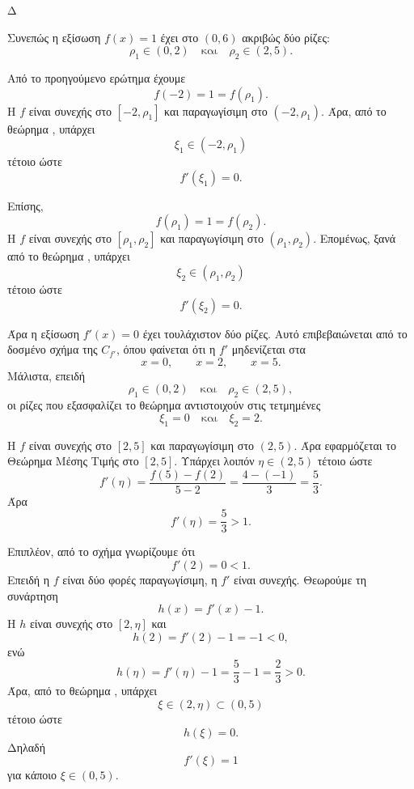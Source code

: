 \begin{thema}{Δ}
\begin{erwthma}
Συνεπώς η εξίσωση $f(x)=1$ έχει στο $(0,6)$ ακριβώς δύο ρίζες:
\[
{\rho_1\in(0,2)\quad\text{και}\quad \rho_2\in(2,5)}.
\]

\item Από το προηγούμενο ερώτημα έχουμε
\[
f(-2)=1=f(\rho_1).
\]
Η $f$ είναι συνεχής στο $[-2,\rho_1]$ και παραγωγίσιμη στο
$(-2,\rho_1)$. Άρα, από το θεώρημα , υπάρχει
\[
\xi_1\in(-2,\rho_1)
\]
τέτοιο ώστε
\[
{f'(\xi_1)=0}.
\]

Επίσης,
\[
f(\rho_1)=1=f(\rho_2).
\]
Η $f$ είναι συνεχής στο $[\rho_1,\rho_2]$ και παραγωγίσιμη στο
$(\rho_1,\rho_2)$. Επομένως, ξανά από το θεώρημα , υπάρχει
\[
\xi_2\in(\rho_1,\rho_2)
\]
τέτοιο ώστε
\[
{f'(\xi_2)=0}.
\]

Άρα η εξίσωση $f'(x)=0$ έχει τουλάχιστον δύο ρίζες. Αυτό επιβεβαιώνεται
από το δοσμένο σχήμα της $C_{f'}$, όπου φαίνεται ότι η $f'$ μηδενίζεται
στα
\[
x=0,\qquad x=2,\qquad x=5.
\]
Μάλιστα, επειδή
\[
\rho_1\in(0,2)\quad\text{και}\quad \rho_2\in(2,5),
\]
οι ρίζες που εξασφαλίζει το θεώρημα  αντιστοιχούν στις
τετμημένες
\[
{\xi_1=0\quad\text{και}\quad \xi_2=2}.
\]

\item Η $f$ είναι συνεχής στο $[2,5]$ και παραγωγίσιμη στο $(2,5)$.
Άρα εφαρμόζεται το Θεώρημα Μέσης Τιμής στο $[2,5]$. Υπάρχει λοιπόν
$\eta\in(2,5)$ τέτοιο ώστε
\[
f'(\eta)=\frac{f(5)-f(2)}{5-2}
=\frac{4-(-1)}{3}
=\frac{5}{3}.
\]
Άρα
\[
f'(\eta)=\frac53>1.
\]

Επιπλέον, από το σχήμα γνωρίζουμε ότι
\[
f'(2)=0<1.
\]
Επειδή η $f$ είναι δύο φορές παραγωγίσιμη, η $f'$ είναι συνεχής.
Θεωρούμε τη συνάρτηση
\[
h(x)=f'(x)-1.
\]
Η $h$ είναι συνεχής στο $[2,\eta]$ και
\[
h(2)=f'(2)-1=-1<0,
\]
ενώ
\[
h(\eta)=f'(\eta)-1=\frac53-1=\frac23>0.
\]
Άρα, από το θεώρημα , υπάρχει
\[
\xi\in(2,\eta)\subset(0,5)
\]
τέτοιο ώστε
\[
h(\xi)=0.
\]
Δηλαδή
\[
{f'(\xi)=1}
\]
για κάποιο $\xi\in(0,5)$.
\end{erwthma}
\end{thema}

